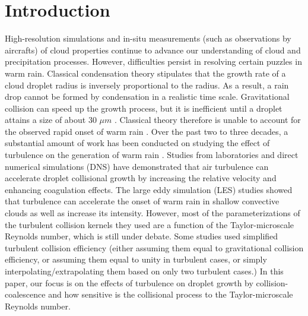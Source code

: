 \section{Introduction} \label{sec:ch2_intro}
High-resolution simulations and in-situ measurements (such as observations by aircrafts) of cloud properties continue to advance our understanding of cloud and precipitation processes. However, difficulties persist in resolving certain puzzles in warm rain. Classical condensation theory stipulates that the growth rate of a cloud droplet radius is inversely proportional to the radius. As a result, a rain drop cannot be formed by condensation in a realistic time scale. Gravitational collision can speed up the growth process, but it is inefficient until a droplet attains a size of about 30 $\mu m$ \citep{Pruppacher1997}. Classical theory therefore is unable to account for the observed rapid onset of warm rain \citep{Szumowski1997, Knight2002}. Over the past two to three decades, a substantial amount of work has been conducted on studying the effect of turbulence on the generation of warm rain \citep[see the reviews by][]{Devenish2012,Grabowski2013}. Studies from laboratories \citep[for instance,][]{Fessler1994} and direct numerical simulations (DNS) \citep[for example,][]{Squires1991, Ayala2008a} have demonstrated that air turbulence can accelerate droplet collisional growth by increasing the relative velocity and enhancing coagulation effects. The large eddy simulation (LES) studies \citep[e.g., ][]{Seifert2010, Wyszogrodzki2013, Franklin2014, Grabowski2015} showed that turbulence can accelerate the onset of warm rain in shallow convective clouds as well as increase its intensity. However, most of the parameterizations of the turbulent collision kernels they used are a function of the Taylor-microscale Reynolds number, which is still under debate. Some studies used simplified turbulent collision efficiency (either assuming them equal to gravitational collision efficiency, or assuming them equal to unity in turbulent cases, or simply interpolating/extrapolating them based on only two turbulent cases.) In this paper, our focus is on the effects of turbulence on droplet growth by collision-coalescence and how sensitive is the collisional process to the Taylor-microscale Reynolds number.

